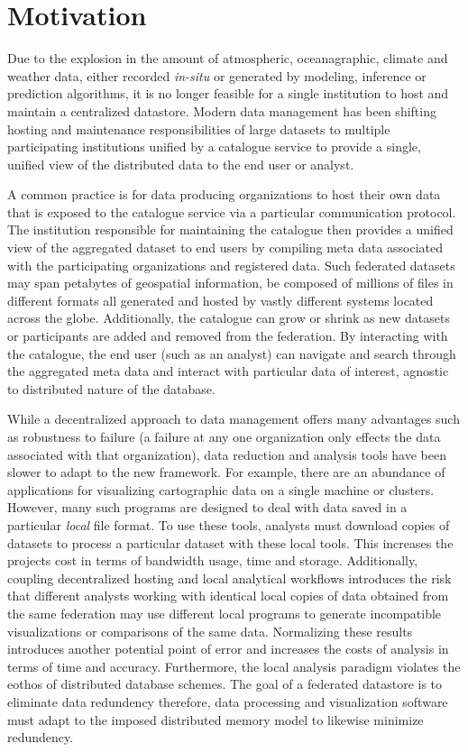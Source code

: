 \section{Motivation}
\label{sec:motivation}
Due to the explosion in the amount of atmospheric, oceanagraphic,
climate and weather data, either recorded \emph{in-situ} or generated
by modeling, inference or prediction algorithms, it is no longer
feasible for a single institution to host and maintain a centralized
datastore. Modern data management has been shifting hosting and
maintenance responsibilities of large datasets to multiple
participating institutions unified by a catalogue service to provide a
single, unified view of the distributed data to the end user or
analyst.

A common practice is for data producing organizations to host their
own data that is exposed to the catalogue service via a particular
communication protocol. The institution responsible for maintaining
the catalogue then provides a unified view of the aggregated dataset
to end users by compiling meta data associated with the participating
organizations and registered data. Such federated datasets may
span petabytes of geospatial information, be composed of millions of
files in different formats all generated and hosted by vastly
different systems located across the globe. Additionally, the
catalogue can grow or shrink as new datasets or participants are added
and removed from the federation. By interacting with the catalogue,
the end user (such as an analyst) can navigate and search through the
aggregated meta data and interact with particular data of
interest, agnostic to distributed nature of the database.

While a decentralized approach to data management offers many
advantages such as robustness to failure (a failure at any one
organization only effects the data associated with that organization),
data reduction and analysis tools have been slower to adapt to the new
framework. For example, there are an abundance of applications for
visualizing cartographic data on a single machine or
clusters. However, many such programs are designed to deal with data
saved in a particular \textit{local} file format. To use these tools,
analysts must download copies of datasets to process a particular
dataset with these local tools. This increases the projects cost in
terms of bandwidth usage, time and storage. Additionally, coupling
decentralized hosting and local analytical workflows introduces the
risk that different analysts working with identical local copies of
data obtained from the same federation may use different local
programs to generate incompatible visualizations or comparisons of the
same data. Normalizing these results introduces another potential
point of error and increases the costs of analysis in terms of time
and accuracy. Furthermore, the local analysis paradigm violates the
eothos of distributed database schemes. The goal of a federated
datastore is to eliminate data redundency therefore, data processing
and visualization software must adapt to the imposed distributed
memory model to likewise minimize redundency.


